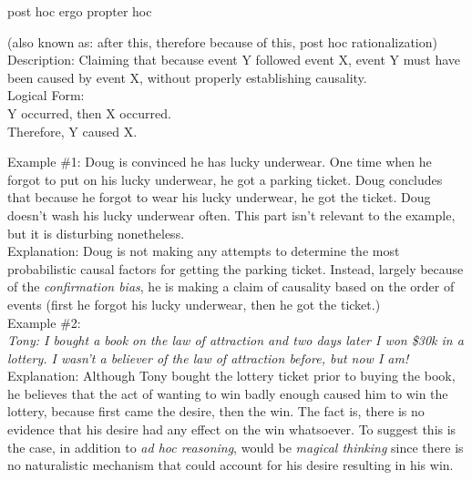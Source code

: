 \documentclass[a4paper,12pt,single,pdftex]{scrbook}
\begin{document}
post hoc ergo propter hoc
    
      (also known as: after this, therefore because of this, post hoc rationalization)
    \\

  
    
      Description: Claiming that because event Y followed event X, event Y must have been caused by event X, without properly establishing causality.
    \\

    
      Logical Form:
    \\

    
      Y occurred, then X occurred.
    \\

    
      Therefore, Y caused X.
    \\

    
       \newline

      

      
        Example \#1: Doug is convinced he has lucky underwear. One time when he forgot to put on his lucky underwear, he got a parking ticket. Doug concludes that because he forgot to wear his lucky underwear, he got the ticket. Doug doesn't wash his lucky underwear often. This part isn't relevant to the example, but it is disturbing nonetheless.
      \\

      
        Explanation: Doug is not making any attempts to determine the most probabilistic causal factors for getting the parking ticket. Instead, largely because of the {\em confirmation bias}, he is making a claim of causality based on the order of events (first he forgot his lucky underwear, then he got the ticket.)
      \\

      
        Example \#2: 
      \\

      
        {\em Tony: I bought a book on the law of attraction and two days later I won \$30k in a lottery. I wasn’t a believer of the law of attraction before, but now I am!}
      \\

      
        Explanation: Although Tony bought the lottery ticket prior to buying the book, he believes that the act of wanting to win badly enough caused him to win the lottery, because first came the desire, then the win. The fact is, there is no evidence that his desire had any effect on the win whatsoever. To suggest this is the case, in addition to {\em ad hoc reasoning}, would be {\em magical thinking}  since there is no naturalistic mechanism that could account for his desire resulting in his win.
      \\
\end{document}
